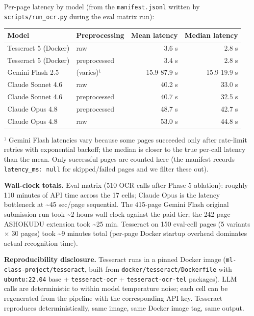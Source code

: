 \documentclass[
  letterpaper,
  DIV=11,
  numbers=noendperiod]{scrartcl}
\newcounter{none} %
\begin{document}
Per-page latency by model (from the \texttt{manifest.jsonl} written by
\texttt{scripts/run\_ocr.py} during the eval matrix run):

{\def\LTcaptype{none} %
\begin{longtable}[]{@{}llrr@{}}
\toprule\noalign{}
Model & Preprocessing & Mean latency & Median latency \\
\midrule\noalign{}
\endhead
\bottomrule\noalign{}
\endlastfoot
Tesseract 5 (Docker) & raw & 3.6 s & 2.8 s \\
Tesseract 5 (Docker) & preprocessed & 3.4 s & 2.8 s \\
Gemini Flash 2.5 & (varies)¹ & 15.9-87.9 s & 15.9-19.9 s \\
Claude Sonnet 4.6 & raw & 40.2 s & 33.0 s \\
Claude Sonnet 4.6 & preprocessed & 40.7 s & 32.5 s \\
Claude Opus 4.8 & preprocessed & 48.7 s & 42.7 s \\
Claude Opus 4.8 & raw & 53.0 s & 44.8 s \\
\end{longtable}
}

¹ Gemini Flash latencies vary because some pages succeeded only after
rate-limit retries with exponential backoff; the median is closer to the
true per-call latency than the mean. Only successful pages are counted
here (the manifest records \texttt{latency\_ms:\ null} for
skipped/failed pages and we filter these out).

\textbf{Wall-clock totals.} Eval matrix (510 OCR calls after Phase 5
ablation): roughly 110 minutes of API time across the 17 cells; Claude
Opus is the latency bottleneck at \textasciitilde45 sec/page sequential.
The 415-page Gemini Flash original submission run took \textasciitilde2
hours wall-clock against the paid tier; the 242-page ASHOKUDU extension
took \textasciitilde25 min. Tesseract on 150 eval-cell pages (5 variants
× 30 pages) took \textasciitilde9 minutes total (per-page Docker startup
overhead dominates actual recognition time).

\textbf{Reproducibility disclosure.} Tesseract runs in a pinned Docker
image (\texttt{ml-class-project/tesseract}, built from
\texttt{docker/tesseract/Dockerfile} with \texttt{ubuntu:22.04} base +
\texttt{tesseract-ocr} + \texttt{tesseract-ocr-tel} packages). LLM calls
are deterministic to within model temperature noise; each cell can be
regenerated from the pipeline with the corresponding API key. Tesseract
reproduces deterministically, same image, same Docker image tag, same
output.
\end{document}
